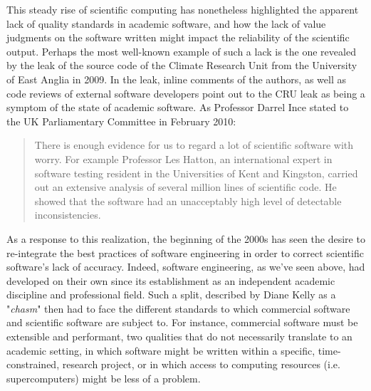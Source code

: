 This steady rise of scientific computing has nonetheless highlighted the apparent lack of quality standards in academic software, and how the lack of value judgments on the software written might impact the reliability of the scientific output. Perhaps the most well-known example of such a lack is the one revealed by the leak of the source code of the Climate Research Unit from the University of East Anglia in 2009\cite{merali_computational_2010}. In the leak, inline comments of the authors, as well as code reviews of external software developers point out to the CRU leak as being a symptom of the state of academic software. As Professor Darrel Ince stated to the UK Parliamentary Committee in February 2010:

\begin{quote}
There is enough evidence for us to regard a lot of scientific software with worry. For example Professor Les Hatton, an international expert in software testing resident in the Universities of Kent and Kingston, carried out an extensive analysis of several million lines of scientific code. He showed that the software had an unacceptably high level of detectable inconsistencies.\cite{committee_disclosure_2010}
\end{quote}

As a response to this realization, the beginning of the 2000s has seen the desire to re-integrate the best practices of software engineering in order to correct scientific software's lack of accuracy\cite{hatton_how_1994}. Indeed, software engineering, as we've seen above, had developed on their own since its establishment as an independent academic discipline and professional field. Such a split, described by Diane Kelly as a "\emph{chasm}"\cite{kelly_software_2007} then had to face the different standards to which commercial software and scientific software are subject to. For instance, commercial software must be extensible and performant, two qualities that do not necessarily translate to an academic setting, in which software might be written within a specific, time-constrained, research project, or in which access to computing resources (i.e. supercomputers) might be less of a problem.

